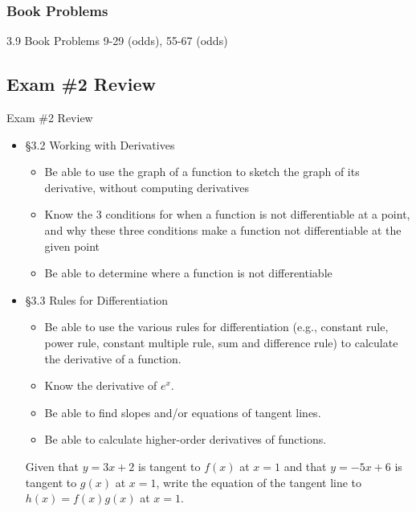 \documentclass[cal1spr16Lectures.tex]{subfiles}
\begin{document}
\subsubsection{Book Problems}

\begin{frame}
\begin{block}{3.9 Book Problems} 9-29 (odds), 55-67 (odds) \end{block}
\end{frame}

\subsection{Exam \#2 Review}
\begin{frame}[allowframebreaks]{Exam \#2 Review}
\begin{itemize}
\item \S 3.2 Working with Derivatives
	\begin{itemize}
	\item Be able to use the graph of a function to sketch the graph of its derivative, without computing derivatives
	\item Know the 3 conditions for when a function is not differentiable at a point, and why these three conditions make a function not differentiable at the given point
	\item Be able to determine where a function is not differentiable
	\end{itemize}
%
\framebreak	
\item \S 3.3 Rules for Differentiation
	\begin{itemize}\footnotesize
	\item Be able to use the various rules for differentiation (e.g., constant rule, power rule, constant multiple rule, sum and difference rule) to calculate the derivative of a function.
	\item Know the derivative of $e^x$.
	\item Be able to find slopes and/or equations of tangent lines.
	\item Be able to calculate higher-order derivatives of functions.
	\end{itemize}
%
\framebreak
\begin{exe}
Given that $y=3x+2$ is tangent to $f(x)$ at $x=1$ and that $y=-5x+6$ is tangent to $g(x)$ at $x=1$, write the equation of the tangent line to $h(x)=f(x)g(x)$ at $x=1$.

\end{exe}
\end{itemize}
\end{frame}
\end{document}
